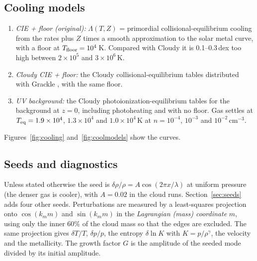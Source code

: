 \documentclass[11pt]{article}
\newcommand{\Teq}{T_{\rm eq}}
\newcommand{\Tfl}{T_{\rm floor}}
\newcommand{\drho}{\delta\rho/\rho}
\begin{document}
\subsection{Cooling models}
\begin{enumerate}
\item \emph{CIE + floor (original):} $\Lambda(T,Z)$ = primordial
  collisional-equilibrium cooling from the \citet{katz96} rates plus $Z$ times a
  smooth approximation to the \citet{sd93} solar metal curve, with a floor at
  $\Tfl=10^4$\,K. Compared with Cloudy it is 0.1--0.3\,dex too high between
  $2\times10^5$ and $3\times10^6$\,K.
\item \emph{Cloudy CIE + floor:} the Cloudy collisional-equilibrium tables
  distributed with Grackle \citep{smith17}, with the same floor.
\item \emph{UV background:} the Cloudy photoionization-equilibrium tables for the
  \citet{hm12} background at $z=0$, including photoheating and with no floor. Gas
  settles at $\Teq=1.9\times10^4$, $1.3\times10^4$ and $1.0\times10^4$\,K at
  $n=10^{-4}$, $10^{-3}$ and $10^{-2}$\,cm$^{-3}$.
\end{enumerate}
Figures~\ref{fig:cooling} and~\ref{fig:coolmodels} show the curves.

\subsection{Seeds and diagnostics}
Unless stated otherwise the seed is $\drho = A\cos(2\pi x/\lambda)$ at uniform
pressure (the denser gas is cooler), with $A=0.02$ in the cloud runs.
Section~\ref{sec:seeds} adds four other seeds. Perturbations are measured by a
least-squares projection onto $\cos(k_m m)$ and $\sin(k_m m)$ in the
\emph{Lagrangian (mass) coordinate} $m$, using only the inner 60\% of the cloud
mass so that the edges are excluded. The same projection gives $\delta T/T$,
$\delta p/p$, the entropy $\delta\ln K$ with $K=p/\rho^\gamma$, the velocity and
the metallicity. The growth factor $G$ is the amplitude of the seeded mode
divided by its initial amplitude.
\end{document}
